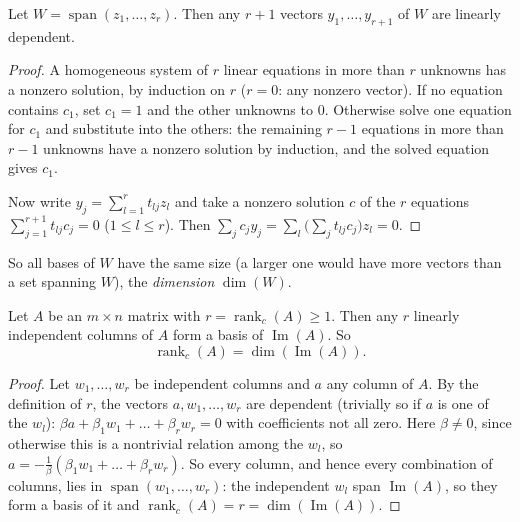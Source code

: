 \begin{claim}\label{lem:span-0917}
    Let $W = \operatorname{span}(z_1, \dots, z_r)$. Then any $r + 1$ vectors $y_1, \dots, y_{r+1}$ of $W$
    are linearly dependent.
\end{claim}

\begin{proof}
    A homogeneous system of $r$ linear equations in more than $r$ unknowns has a
    nonzero solution, by induction on $r$ ($r = 0$: any nonzero vector). If no equation contains $c_1$,
    set $c_1 = 1$ and the other unknowns to $0$. Otherwise solve one equation for $c_1$ and substitute into
    the others: the remaining $r - 1$ equations in more than $r - 1$ unknowns have a nonzero solution by
    induction, and the solved equation gives $c_1$.

    Now write $y_j = \sum_{l=1}^{r} t_{lj} z_l$ and take a nonzero solution $c$ of the
    $r$ equations $\sum_{j=1}^{r+1} t_{lj} c_j = 0$ ($1 \leq l \leq r$). Then
    $\sum_{j} c_j y_j = \sum_{l} \big(\sum_{j} t_{lj} c_j\big) z_l = 0$.
\end{proof}

So all bases of $W$ have the same size (a larger one would have more vectors than a set spanning $W$),
the \emph{dimension} $\dim(W)$.

\begin{claim}\label{lem:colbasis-0917}
    Let $A$ be an $m \times n$ matrix with $r = \operatorname{rank}_c(A) \geq 1$. Then any $r$ linearly
    independent columns of $A$ form a basis of $\operatorname{Im}(A)$. So
    \[\operatorname{rank}_c(A) = \dim(\operatorname{Im}(A)).\]
\end{claim}

\begin{proof}
    Let $w_1, \dots, w_r$ be independent columns and $a$ any column of $A$. By the definition of $r$,
    the vectors $a, w_1, \dots, w_r$ are dependent (trivially so if $a$ is one of the $w_l$):
    $\beta a + \beta_1 w_1 + \dots + \beta_r w_r = 0$ with coefficients not all zero. Here
    $\beta \neq 0$, since otherwise this is a nontrivial relation among the $w_l$, so
    $a = -\frac{1}{\beta}(\beta_1 w_1 + \dots + \beta_r w_r)$. So every column, and hence every
    combination of columns, lies in $\operatorname{span}(w_1, \dots, w_r)$: the independent $w_l$ span
    $\operatorname{Im}(A)$, so they form a basis of it and
    $\operatorname{rank}_c(A) = r = \dim(\operatorname{Im}(A))$.
\end{proof}

